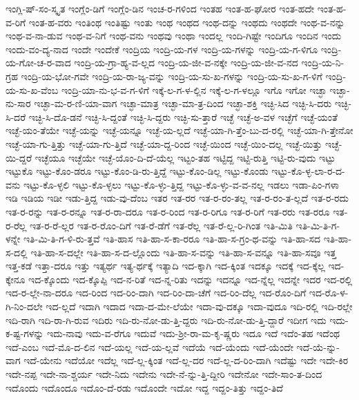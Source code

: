 {ಇಂಗ್ಲಿ-ಷ್-ಸಂ-ಸ್ಕೃತ
ಇಂಗ್ಲೆಂ-ಡಿಗೆ
ಇಂಗ್ಲೆಂ-ಡಿನ
ಇಂಚ-ರ-ಗಳಿಂದ
ಇಂತಹ
ಇಂತ-ಹ-ಘೋರ
ಇಂತ-ಹದೇ
ಇಂತ-ಹ-ವ-ರಿಗೆ
ಇಂತ-ಹ-ವರು
ಇಂತಿಂಥ
ಇಂತಿಷ್ಟು
ಇಂತು
ಇಂಥ
ಇಂಥದ
ಇಂಥ-ದನ್ನು
ಇಂಥದು
ಇಂಥದೇ
ಇಂಥ-ವ-ನನ್ನು
ಇಂಥ-ವ-ನಾ-ಡುವ
ಇಂಥ-ವ-ನಿಗೆ
ಇಂಥ-ವನು
ಇಂಥವು
ಇಂಥಾ
ಇಂದಲ್ಲ
ಇಂದಿ-ಗಿಷ್ಟೇ
ಇಂದಿಗೂ
ಇಂದಿನ
ಇಂದು
ಇಂದು-ವಂ-ದ್ಯ-ನಾದ
ಇಂದೇ
ಇಂದೇಕೆ
ಇಂದ್ರಿಯ
ಇಂದ್ರಿ-ಯ-ಗಳ
ಇಂದ್ರಿ-ಯ-ಗಳನ್ನು
ಇಂದ್ರಿ-ಯ-ಗ-ಳಿಗೂ
ಇಂದ್ರಿ-ಯ-ಗೋ-ಚ-ರ-ವಾದ
ಇಂದ್ರಿ-ಯ-ಗ್ರಾ-ಹ್ಯ-ವ-ಲ್ಲದ
ಇಂದ್ರಿ-ಯ-ಜೀ-ವ-ನಕ್ಕೇ
ಇಂದ್ರಿ-ಯ-ಜೀ-ವ-ನದ
ಇಂದ್ರಿ-ಯ-ನಿ-ಗ್ರಹ
ಇಂದ್ರಿ-ಯ-ಭೋ-ಗವೇ
ಇಂದ್ರಿ-ಯ-ರಾ-ಜ್ಯ-ವನ್ನು
ಇಂದ್ರಿ-ಯ-ಸು-ಖ-ಗಳನ್ನು
ಇಂದ್ರಿ-ಯ-ಸು-ಖ-ಗ-ಳಿಗೆ
ಇಂದ್ರಿ-ಯ-ಸು-ಖ-ವೆಂಬ
ಇಂದ್ರಿ-ಯಾ-ನು-ಭ-ವ-ಗ-ಳಿಗೆ
ಇಕ್ಕೆ-ಲ-ಗ-ಳ-ಲ್ಲಿನ
ಇಕ್ಕೆ-ಲ-ಗ-ಳಲ್ಲೂ
ಇಗೊ
ಇಗೋ
ಇಚ್ಛಾ
ಇಚ್ಛಾ-ನು-ಸಾರ
ಇಚ್ಛಾ-ಮ-ರ-ಣಿ-ಯಾ-ವಾಗ
ಇಚ್ಛಾ-ಮಾತ್ರ
ಇಚ್ಛಾ-ಮಾ-ತ್ರ-ದಿಂದ
ಇಚ್ಛಾ-ಶಕ್ತಿ
ಇಚ್ಛಿ-ಸಿದ
ಇಚ್ಛಿ-ಸಿ-ದರು
ಇಚ್ಛಿ-ಸಿ-ದರೆ
ಇಚ್ಛಿ-ಸಿ-ದೊ-ಡನೆ
ಇಚ್ಛಿ-ಸಿ-ದ್ದಂತೆ
ಇಚ್ಛಿ-ಸಿ-ದ್ದರು
ಇಚ್ಛಿ-ಸು-ತ್ತಾರೆ
ಇಚ್ಛೆ
ಇಚ್ಛೆ-ಅ-ವಳ
ಇಚ್ಛೆಗೆ
ಇಚ್ಛೆ-ಯಂತೆ
ಇಚ್ಛೆ-ಯಂ-ತೆಯೇ
ಇಚ್ಛೆ-ಯನ್ನು
ಇಚ್ಛೆ-ಯನ್ನೂ
ಇಚ್ಛೆ-ಯ-ಲ್ಲದೆ
ಇಚ್ಛೆ-ಯಾ-ಗಿ-ತ್ತೆಂ-ಬು-ದ-ರಲ್ಲಿ
ಇಚ್ಛೆ-ಯಾ-ಗಿ-ತ್ತೇನೋ
ಇಚ್ಛೆ-ಯಾ-ಗು-ತ್ತಿತ್ತು
ಇಚ್ಛೆ-ಯಾ-ಗು-ತ್ತಿದೆ
ಇಚ್ಛೆ-ಯಾ-ದ್ದ-ರಿಂದ
ಇಚ್ಛೆ-ಯಿಂದ
ಇಚ್ಛೆ-ಯಿಂ-ದಲ್ಲ
ಇಚ್ಛೆ-ಯಿತ್ತು
ಇಚ್ಛೆ-ಯಿ-ದ್ದರೆ
ಇಚ್ಛೆಯೂ
ಇಚ್ಛೆಯೇ
ಇಚ್ಛೆ-ಯೊಂ-ದಿ-ದೆ-ಯೆಲ್ಲ
ಇಟ್ಟಂ-ತಹ
ಇಟ್ಟಿದ್ದ
ಇಟ್ಟಿ-ರುತ್ತಿ
ಇಟ್ಟಿ-ರು-ವುದು
ಇಟ್ಟು
ಇಟ್ಟುಕೊ
ಇಟ್ಟು-ಕೊಂ-ಡರೂ
ಇಟ್ಟು-ಕೊಂ-ಡಿ-ರು-ತ್ತಿದ್ದೆ
ಇಟ್ಟು-ಕೊಂ-ಡಿಲ್ಲ
ಇಟ್ಟು-ಕೊಂಡು
ಇಟ್ಟು-ಕೊ-ಳ್ಳ-ಲಾ-ರ-ದ-ವನು
ಇಟ್ಟು-ಕೊ-ಳ್ಳಲಿ
ಇಟ್ಟು-ಕೊ-ಳ್ಳಲು
ಇಟ್ಟು-ಕೊ-ಳ್ಳು-ತ್ತಿದ್ದ
ಇಟ್ಟು-ಕೊ-ಳ್ಳು-ವ-ವ-ನಲ್ಲ
ಇಡಲು
ಇಡಾ-ಪಿಂ-ಗಳಾ
ಇಡಿ
ಇಡಿಯ
ಇಡೀ
ಇಡು-ತ್ತಿದ್ದ
ಇಡು-ವು-ದೆಂಬ
ಇತರ
ಇತ-ರರ
ಇತ-ರ-ರಂ-ತಲ್ಲ
ಇತ-ರ-ರಂ-ತ-ಲ್ಲದೆ
ಇತ-ರ-ರದು
ಇತ-ರ-ರನ್ನು
ಇತ-ರ-ರನ್ನೂ
ಇತ-ರ-ರಾ-ದರೂ
ಇತ-ರ-ರಿಂದ
ಇತ-ರ-ರಿಗೂ
ಇತ-ರ-ರಿಗೆ
ಇತ-ರರು
ಇತ-ರರೂ
ಇತ-ರ-ರೆಲ್ಲ
ಇತ-ರ-ರೆ-ಲ್ಲರ
ಇತ-ರ-ರೊಂ-ದಿಗೆ
ಇತ-ರೆ-ಡೆಗೆ
ಇತ-ರೆಲ್ಲ
ಇತ-ರೆ-ಲ್ಲ-ರಿ-ಗಿಂತ
ಇತಿ-ಮಿತಿ
ಇತಿ-ಮಿ-ತಿ-ಗ-ಳನ್ನೇ
ಇತಿ-ಮಿ-ತಿ-ಗ-ಳಿ-ರು-ತ್ತವೆ
ಇತಿ-ಹಾಸ
ಇತಿ-ಹಾ-ಸ-ಕಾ-ರರೂ
ಇತಿ-ಹಾ-ಸ-ಗ್ರಂ-ಥ-ವನ್ನು
ಇತಿ-ಹಾ-ಸದ
ಇತಿ-ಹಾ-ಸ-ದಲ್ಲಿ
ಇತಿ-ಹಾ-ಸ-ದಲ್ಲೇ
ಇತಿ-ಹಾ-ಸ-ದ-ಲ್ಲೊಂದು
ಇತಿ-ಹಾ-ಸ-ವನ್ನು
ಇತಿ-ಹಾ-ಸ-ವನ್ನೂ
ಇತಿ-ಹಾ-ಸವೂ
ಇತ್ತ
ಇತ್ತ-ಕಡೆ
ಇತ್ತಾ-ದರೂ
ಇತ್ತು
ಇತ್ಯರ್ಥ
ಇತ್ಯ-ರ್ಥಕ್ಕೆ
ಇತ್ಯಾದಿ
ಇದ-ಕ್ಕಾಗಿ
ಇದ-ಕ್ಕಿಂತ
ಇದಕ್ಕೂ
ಇದಕ್ಕೆ
ಇದ-ಕ್ಕೆಲ್ಲ
ಇದ-ಕ್ಕೇನೂ
ಇದ-ಕ್ಕೊಂದು
ಇದ-ಕ್ಕೊಪ್ಪಿ
ಇದ-ನ-ರಿತೆ
ಇದ-ನ್ನ-ರಿತು
ಇದನ್ನು
ಇದನ್ನೂ
ಇದ-ನ್ನೆಲ್ಲ
ಇದನ್ನೇ
ಇದರ
ಇದ-ರಲ್ಲಿ
ಇದ-ರ-ಲ್ಲೇ-ನಾ-ದರೂ
ಇದ-ರಿಂದ
ಇದ-ರಿಂ-ದಾಗಿ
ಇದ-ರಿಂ-ದಾ-ಚೆಗೆ
ಇದ-ರಿಂ-ದೆಲ್ಲ
ಇದ-ರೊಂ-ದಿಗೆ
ಇದ-ರೊ-ಳ-ಗಿ-ನಿಂ-ದಲೇ
ಇದ-ಲ್ಲದೆ
ಇದಾಗಿ
ಇದಾದ
ಇದಾ-ದ-ಮೇ-ಲೆಯೇ
ಇದಾ-ವು-ದಕ್ಕೂ
ಇದಾ-ವುದೂ
ಇದಿ-ರಲ್ಲಿ
ಇದಿ-ರಲ್ಲೇ
ಇದಿ-ರಾಗಿ
ಇದಿ-ರಾ-ಗಿ-ರುವ
ಇದಿರು
ಇದಿ-ರು-ನೋ-ಡು-ತ್ತಿ-ದ್ದರು
ಇದಿ-ರು-ನೋ-ಡು-ತ್ತಿ-ದ್ದಾರೆ
ಇದೀಗ
ಇದು
ಇದು-ಕ-ಷ್ಟ-ಗಳನ್ನು
ಇದು-ನಾವು
ಇದು-ವ-ರೆಗೂ
ಇದುವೆ
ಇದು-ಶ್ರೀ-ರಾ-ಮ-ಕೃ-ಷ್ಣರು
ಇದೂ
ಇದೆ
ಇದೆಂ-ತಹ
ಇದೆಂಥ
ಇದೆ-ಎಂಬ
ಇದೆ-ಮೊ-ದ-ಲಿನ
ಇದೆ-ಯಲ್ಲ
ಇದೆ-ಯ-ಲ್ಲವೆ
ಇದೆಯೆ
ಇದೆ-ಯೆಂದು
ಇದೆ-ಯೆಂದೇ
ಇದೆ-ಯೆ-ನ್ನು-ವಾಗ
ಇದೆ-ಯೇನು
ಇದೆಯೋ
ಇದೆಲ್ಲ
ಇದೆ-ಲ್ಲ-ಕ್ಕಿಂತ
ಇದೆ-ಲ್ಲ-ದರ
ಇದೆ-ಲ್ಲ-ದ-ರಿಂ-ದಾಗಿ
ಇದೆಷ್ಟು
ಇದೇ
ಇದೇ-ಕಿರ
ಇದೇ-ನಪ್ಪ
ಇದೇ-ನಾ-ಶ್ಚರ್ಯ
ಇದೇ-ನಿದು
ಇದೇನು
ಇದೇ-ನೆ-ನ್ನು-ತ್ತಿ-ದ್ದೀರಿ
ಇದೇನೋ
ಇದೇ-ಸಾಂ-ತ-ದಿಂದ
ಇದೊಂದು
ಇದೊಂದೂ
ಇದೊಂ-ದೆ-ರಡು
ಇದೊಂದೇ
ಇದೋ
ಇದ್ದ
ಇದ್ದಂ-ತಿತ್ತು
ಇದ್ದಂ-ತಿದೆ
}
